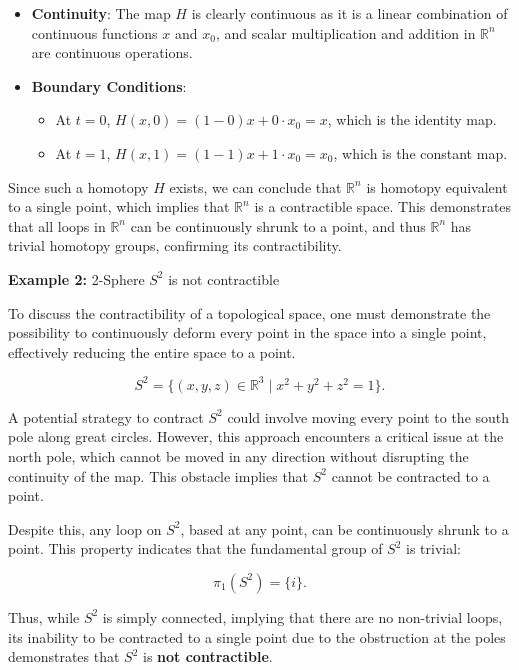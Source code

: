 \documentclass{article}
\begin{document}
\begin{itemize}
    \item \textbf{Continuity}: The map $H$ is clearly continuous as it is a linear combination of continuous functions $x$ and $x_0$, and scalar multiplication and addition in $\mathbb{R}^n$ are continuous operations.
    \item \textbf{Boundary Conditions}:
    \begin{itemize}
        \item At $t = 0$, $H(x, 0) = (1 - 0)x + 0 \cdot x_0 = x$, which is the identity map.
        \item At $t = 1$, $H(x, 1) = (1 - 1)x + 1 \cdot x_0 = x_0$, which is the constant map.
\end{itemize}
\end{itemize}

Since such a homotopy $H$ exists, we can conclude that $\mathbb{R}^n$ is homotopy equivalent to a single point, which implies that $\mathbb{R}^n$ is a contractible space. This demonstrates that all loops in $\mathbb{R}^n$ can be continuously shrunk to a point, and thus $\mathbb{R}^n$ has trivial homotopy groups, confirming its contractibility.

\textbf{Example 2:} 2-Sphere $S^2$ is not contractible 

To discuss the contractibility of a topological space, one must demonstrate the possibility to continuously deform every point in the space into a single point, effectively reducing the entire space to a point.

\[
S^2 = \{(x,y,z) \in \mathbb{R}^3 \mid x^2 + y^2 + z^2 = 1\}.
\]

A potential strategy to contract $S^2$ could involve moving every point to the south pole along great circles. However, this approach encounters a critical issue at the north pole, which cannot be moved in any direction without disrupting the continuity of the map. This obstacle implies that $S^2$ cannot be contracted to a point.

Despite this, any loop on $S^2$, based at any point, can be continuously shrunk to a point. This property indicates that the fundamental group of $S^2$ is trivial:

\[
\pi_1(S^2) = \{i\}.
\]

Thus, while $S^2$ is simply connected, implying that there are no non-trivial loops, its inability to be contracted to a single point due to the obstruction at the poles demonstrates that $S^2$ is \textbf{not contractible}.
\end{document}
